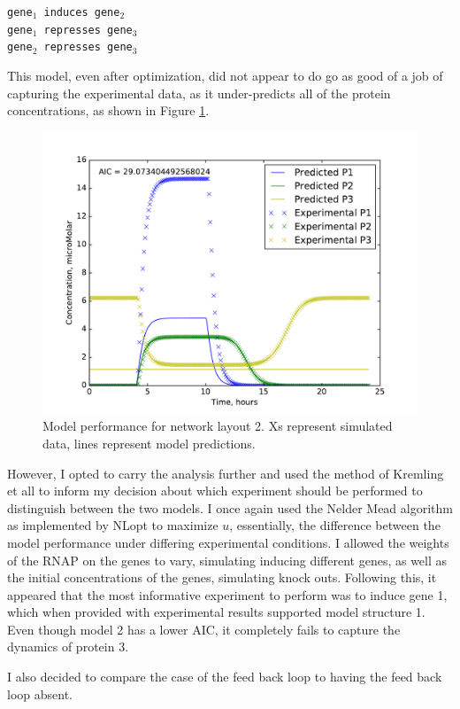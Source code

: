 \documentclass{article}
\begin{document}
\begin{centering}
\texttt{gene$_1$ induces gene$_2$\\
gene$_1$ represses gene$_3$\\
gene$_2$ represses gene$_3$\\
}
\end{centering}
This model, even after optimization, did not appear to do go as good of a job of capturing the experimental data, as it under-predicts all of the protein concentrations, as shown in Figure \ref{fig:P3Layout3}.
\begin{figure}[h!]
\includegraphics[width=12cm]{../Problem3/figures/postNMPlotLayout3}
\caption{Model performance for network layout 2. Xs represent simulated data, lines represent model predictions.}
\label{fig:P3Layout3}
\end{figure}

However, I opted to carry the analysis further and used the method of Kremling et all to inform my decision about which experiment should be performed to distinguish between the two models. I once again used the Nelder Mead algorithm as implemented by NLopt to maximize $u$, essentially, the difference between the model performance under differing experimental conditions. I allowed the weights of the RNAP on the genes to vary, simulating inducing different genes, as well as the initial concentrations of the genes, simulating knock outs. Following this, it appeared that the most informative experiment to perform was to induce gene 1, which when provided with experimental results supported model structure 1. Even though model 2 has a lower AIC, it completely fails to capture the dynamics of protein 3.

I also decided to compare the case of the feed back loop to having the feed back loop absent. \\
\end{document}
